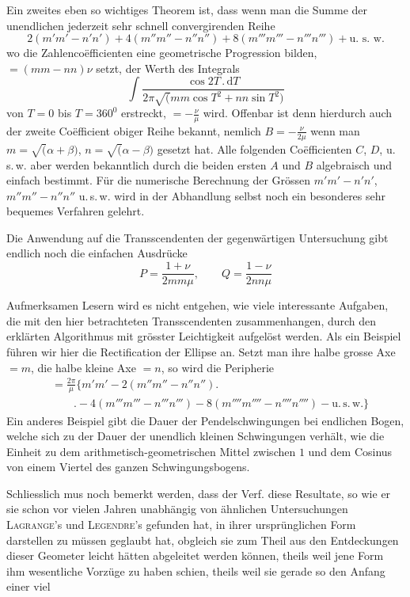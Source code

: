 Ein zweites eben so wichtiges Theorem ist, dass wenn man die Summe der
unendlichen jederzeit sehr schnell convergirenden Reihe
\[
2(m'm'-n'n')+4(m''m''-n''n'')+8(m'''m'''-n'''n''')+\mbox{u. s. w.}
\]
wo die Zahlencoëfficienten eine geometrische Progression bilden, $=(mm-nn)\nu$
setzt, der Werth des Integrals
\[
\int\frac{\cos2T\,.\,\mathrm{d}T}
{2\pi\surd(mm\cos T^{2}+nn\sin T^{2})}
\]
von $T=0$ bis $T=360^{0}$ erstreckt, $=-\frac{\nu}{\mu}$ wird. Offenbar ist denn hierdurch auch der zweite Coëfficient obiger Reihe bekannt, nemlich $B=-\frac{\nu}{2\mu}$
wenn man $m=\surd(\alpha+\beta)$, $n=\surd(\alpha-\beta)$ gesetzt hat. Alle folgenden Coëfficienten $C$, $D$, u.\,s.\,w. aber werden bekanntlich durch die beiden ersten $A$ und $B$
algebraisch und einfach bestimmt. Für die numerische Berechnung der Grössen
$m'm'-n'n'$, $m''m''-n''n''$ u.\,s.\,w. wird in der Abhandlung selbst noch ein besonderes
sehr bequemes Verfahren gelehrt.
\par
Die Anwendung auf die Transscendenten der gegenwärtigen Untersuchung
gibt endlich noch die einfachen Ausdrücke
\[
P=\frac{1+\nu}{2mm\mu},\qquad Q=\frac{1-\nu}{2nn\mu}
\]
\par Aufmerksamen Lesern wird es nicht entgehen, wie viele interessante Aufgaben, die mit den hier betrachteten Transscendenten zusammenhangen, durch
den erklärten Algorithmus mit grösster Leichtigkeit aufgelöst werden. Als ein
Beispiel führen wir hier die Rectification der Ellipse an. Setzt man ihre halbe
grosse Axe $=m$, die halbe kleine Axe $=n$, so wird die Peripherie
\[
\begin{aligned}&=\frac{2\pi}{\mu}\bigl\{m'm'-2(m''m''-n''n'')\bigr.\\[5pt]&\qquad\bigl.-4(m'''m'''-n'''n''')-8(m''''m''''-n''''n'''')-\mathrm{u.\,s.\,w.}\bigr\}\end{aligned}
\]
Ein anderes Beispiel gibt die Dauer der Pendelschwingungen bei endlichen Bogen, welche sich zu der Dauer der unendlich kleinen Schwingungen verhält, wie
die Einheit zu dem arithmetisch-geometrischen Mittel zwischen $1$ und dem Cosinus von einem Viertel des ganzen Schwingungsbogens.
\par
Schliesslich mus noch bemerkt werden, dass der Verf. diese Resultate, so
wie er sie schon vor vielen Jahren unabhängig von ähnlichen Untersuchungen
\textsc{Lagrange}'s und \textsc{Legendre}'s gefunden hat, in ihrer ursprünglichen Form darstellen
zu müssen geglaubt hat, obgleich sie zum Theil aus den Entdeckungen dieser Geometer leicht hätten abgeleitet werden können, theils weil jene Form ihm wesentliche Vorzüge zu haben schien, theils weil sie gerade so den Anfang einer viel

